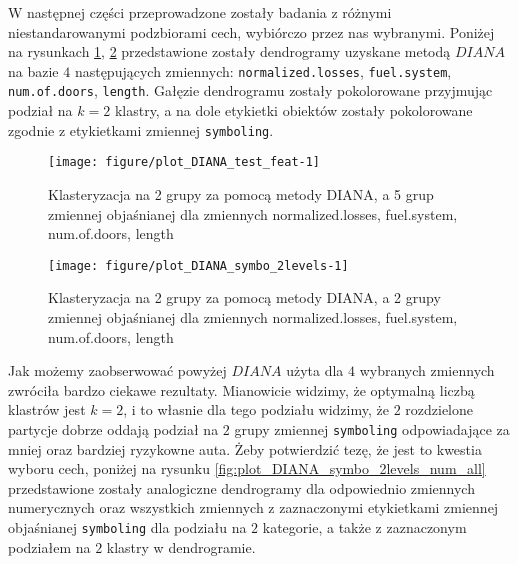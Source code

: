 \documentclass[12pt, a4paper]{article}\usepackage[]{graphicx}\usepackage[]{xcolor}
\makeatletter
\def\maxwidth{ %
  \ifdim\Gin@nat@width>\linewidth
    \linewidth
  \else
    \Gin@nat@width
  \fi
}
\newenvironment{knitrout}{}{} %
\makeatother
\begin{document}
\par W następnej części przeprowadzone zostały badania z różnymi niestandarowanymi podzbiorami cech, wybiórczo przez nas wybranymi. Poniżej na rysunkach \ref{fig:plot_DIANA_test_feat}, \ref{fig:plot_DIANA_symbo_2levels} przedstawione zostały dendrogramy uzyskane metodą $DIANA$ na bazie $4$ następujących zmiennych: \texttt{normalized.losses}, \texttt{fuel.system}, \texttt{num.of.doors}, \texttt{length}. Gałęzie dendrogramu zostały pokolorowane przyjmując podział na $k=2$ klastry, a na dole etykietki obiektów zostały pokolorowane zgodnie z etykietkami zmiennej \texttt{symboling}.

\begin{knitrout}
\color{fgcolor}\begin{figure}[H]

{\centering \texttt{[image: figure/plot\_DIANA\_test\_feat-1]} 

}

\caption[Klasteryzacja na 2 grupy za pomocą metody DIANA, a 5 grup zmiennej objaśnianej dla zmiennych normalized.losses, fuel.system, num.of.doors, length]{Klasteryzacja na 2 grupy za pomocą metody DIANA, a 5 grup zmiennej objaśnianej dla zmiennych normalized.losses, fuel.system, num.of.doors, length}\label{fig:plot_DIANA_test_feat}
\end{figure}

\end{knitrout}

\begin{knitrout}
\color{fgcolor}\begin{figure}[H]

{\centering \texttt{[image: figure/plot\_DIANA\_symbo\_2levels-1]} 

}

\caption[Klasteryzacja na 2 grupy za pomocą metody DIANA, a 2 grupy zmiennej objaśnianej dla zmiennych normalized.losses, fuel.system, num.of.doors, length]{Klasteryzacja na 2 grupy za pomocą metody DIANA, a 2 grupy zmiennej objaśnianej dla zmiennych normalized.losses, fuel.system, num.of.doors, length}\label{fig:plot_DIANA_symbo_2levels}
\end{figure}

\end{knitrout}

Jak możemy zaobserwować powyżej $DIANA$ użyta dla $4$ wybranych zmiennych zwróciła bardzo ciekawe rezultaty. Mianowicie widzimy, że optymalną liczbą klastrów jest $k=2$, i to własnie dla tego podziału widzimy, że $2$ rozdzielone partycje dobrze oddają podział na $2$ grupy zmiennej \texttt{symboling} odpowiadające za mniej oraz bardziej ryzykowne auta. Żeby potwierdzić tezę, że jest to kwestia wyboru cech, poniżej na rysunku \ref{fig:plot_DIANA_symbo_2levels_num_all} przedstawione zostały analogiczne dendrogramy dla odpowiednio zmiennych numerycznych oraz wszystkich zmiennych z zaznaczonymi etykietkami zmiennej objaśnianej \texttt{symboling} dla podziału na $2$ kategorie, a także z zaznaczonym podziałem na $2$ klastry w dendrogramie.
\end{document}
